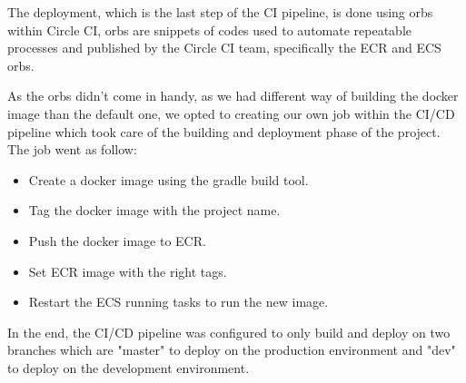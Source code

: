 The deployment, which is the last step of the CI pipeline, is done using orbs
within Circle CI, orbs are snippets of codes used to automate repeatable processes
and published by the Circle CI team, specifically the ECR and ECS orbs.

As the orbs didn't come in handy, as we had different way of building the docker image
than the default one, we opted to creating our own job within the CI/CD pipeline
which took care of the building and deployment phase of the project.
The job went as follow: 
    \begin{itemize}
        \item Create a docker image using the gradle build tool.
        \item Tag the docker image with the project name.
        \item Push the docker image to ECR.
        \item Set ECR image with the right tags.
        \item Restart the ECS running tasks to run the new image.
    \end{itemize}

In the end, the CI/CD pipeline was configured to only build and deploy on two branches
which are "master" to deploy on the production environment and "dev" to deploy on the
development environment.
